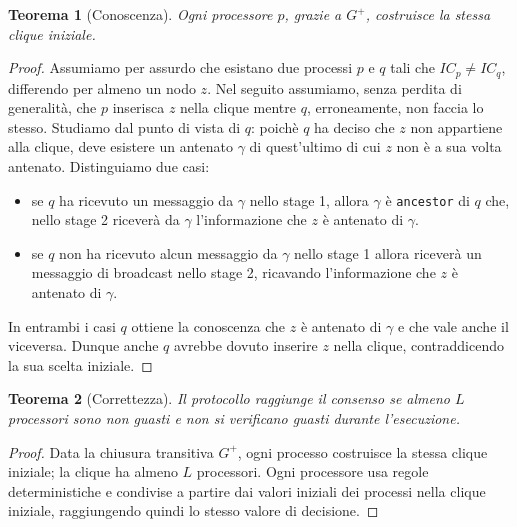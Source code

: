 \documentclass{article}
\newtheorem{teorema}{Teorema}
\begin{document}
\begin{teorema}[Conoscenza]Ogni processore $p$, grazie a $G^+$, costruisce la stessa clique iniziale.\end{teorema}
\begin{proof}
Assumiamo per assurdo che esistano due processi $p$ e $q$ tali che $IC_p\neq IC_q$, differendo per almeno un nodo $z$. Nel seguito assumiamo, senza perdita di generalità, che $p$ inserisca $z$ nella clique mentre $q$, erroneamente, non faccia lo stesso. Studiamo dal punto di vista di $q$: poichè $q$ ha deciso che $z$ non appartiene alla clique, deve esistere un antenato $\gamma$ di quest'ultimo di cui $z$ non è a sua volta antenato. Distinguiamo due casi:
\begin{itemize}
\item se $q$ ha ricevuto un messaggio da $\gamma$ nello stage 1, allora $\gamma$ è \texttt{ancestor} di $q$ che, nello stage 2 riceverà da $\gamma$ l'informazione che $z$ è antenato di $\gamma$.
\item se $q$ non ha ricevuto alcun messaggio da $\gamma$ nello stage 1 allora riceverà un messaggio di broadcast nello stage 2, ricavando l'informazione che $z$ è antenato di $\gamma$.  
\end{itemize} 
 In entrambi i casi $q$ ottiene la conoscenza che $z$ è antenato di $\gamma$ e che vale anche il viceversa. Dunque anche $q$ avrebbe dovuto inserire $z$ nella clique, contraddicendo la sua scelta iniziale.
\end{proof}

\begin{teorema}[Correttezza]Il protocollo raggiunge il consenso se almeno $L$ processori sono non guasti e non si verificano guasti durante l'esecuzione.\end{teorema}
\begin{proof}
Data la chiusura transitiva $G^+$, ogni processo costruisce la stessa clique iniziale; la clique ha almeno $L$ processori.
Ogni processore usa regole deterministiche e condivise a partire dai valori iniziali dei processi nella clique iniziale, raggiungendo quindi lo stesso valore di decisione.
\end{proof}
\end{document}
